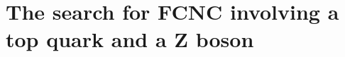 \chapter{The search for FCNC involving a top quark and a Z boson}
\label{chap:6}

\begin{comment}
\section{Model assumptions}
\section{Data and simulation}
\subsection{Standard Model Background simulation}





The physics analysis
`Measurement of the top pair-production in association with a W or Z boson in pp collisions at 13 TeV`
(CADI entry TOP-17-005)
will be presented for approval at the physics meeting on Thu, May 4, 2017:

https://indico.cern.ch/event/635522/#12-top-17-005-measurement-of-t

The corresponding documentation can be found on CADI at:
http://cms.cern.ch/iCMS/analysisadmin/cadi?ancode=TOP-17-005


\subsection{FCNC signal simulation}
In this thesis, two scenarios are being studied: one being the top-up interactions and the second one being top-charm interactions. For a given flavour of light quark \Pquark, all left-handed chiral parameters were set to zero and all right-handed set to one

\end{comment}
